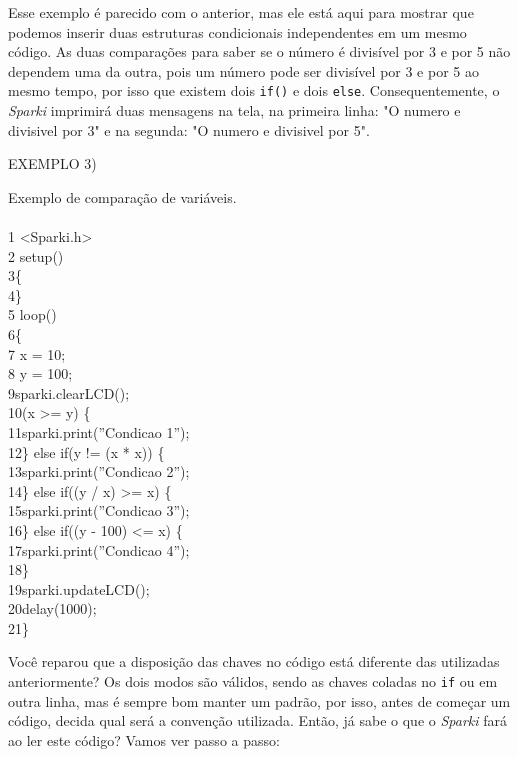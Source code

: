 \documentclass[conference]{IEEEtran}
\begin{document}
Esse exemplo é parecido com o anterior, mas ele está aqui para mostrar que podemos inserir duas estruturas condicionais independentes em um mesmo código. As duas comparações para saber se o número é divisível por 3 e por 5 não dependem uma da outra, pois um número pode ser divisível por 3 e por 5 ao mesmo tempo, por isso que existem dois \texttt{if()} e dois \texttt{else}. Consequentemente, o \textit{Sparki} imprimirá duas mensagens na tela, na primeira linha: "O numero e divisivel por 3" e na segunda: "O numero e divisivel por 5".
\\
\begin{center}
EXEMPLO 3)
\end{center}
\par
Exemplo de comparação de variáveis.
\\
\\
{\selectfont 
{\color{cinza}1} <Sparki.h>\\
{\color{cinza}2} setup()\\
{\color{cinza}3}\quad\{\\
{\color{cinza}4}\quad\}\\
{\color{cinza}5} loop()\\
{\color{cinza}6}\quad\{\\
{\color{cinza}7}\quad{} x = 10;\\
{\color{cinza}8}\quad{} y = 100;\\
{\color{cinza}9}\quad\quad sparki.clearLCD();\\
{\color{cinza}10}\quad{}(x >= y) \{\\
{\color{cinza}11}\quad\quad\quad sparki.print({\color{verde}''Condicao 1''});\\
{\color{cinza}12}\quad\quad\} {\color{verde}else if}(y != (x * x)) \{\\
{\color{cinza}13}\quad\quad\quad sparki.print({\color{verde}''Condicao 2''});\\
{\color{cinza}14}\quad\quad\} {\color{verde}else if}((y / x) >= x) \{\\
{\color{cinza}15}\quad\quad\quad sparki.print({\color{verde}''Condicao 3''});\\
{\color{cinza}16}\quad\quad\} {\color{verde}else if}((y - 100) <= x) \{\\
{\color{cinza}17}\quad\quad\quad sparki.print({\color{verde}''Condicao 4''});\\
{\color{cinza}18}\quad\quad\}\\
{\color{cinza}19}\quad\quad sparki.updateLCD();\\
{\color{cinza}20}\quad\quad delay(1000);\\
{\color{cinza}21}\quad\}}
\\
\par
Você reparou que a disposição das chaves no código está diferente das utilizadas anteriormente? Os dois modos são válidos, sendo as chaves coladas no \texttt{if} ou em outra linha, mas é sempre bom manter um padrão, por isso, antes de começar um código, decida qual será a convenção utilizada. Então, já sabe o que o \textit{Sparki} fará ao ler este código? Vamos ver passo a passo:
\end{document}
